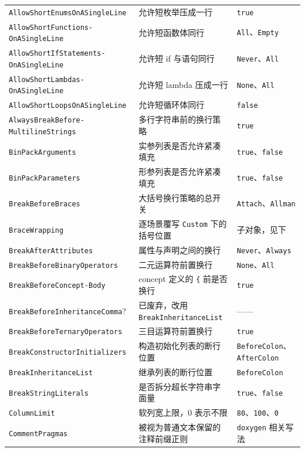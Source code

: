 \documentclass[12pt,a4paper,fontset=fandol]{ctexbook}
\begin{document}
{\begin{longtable}{@{}>{\raggedright\arraybackslash}p{}
                  >{\raggedright\arraybackslash}p{}
                  >{\raggedright\arraybackslash}p{}@{}}
\texttt{AllowShortEnums\allowbreak OnASingleLine} & 允许短枚举压成一行 & \texttt{true} \\
\texttt{AllowShortFunctions-\allowbreak OnASingleLine} & 允许短函数体同行 & \texttt{All}、\texttt{Empty} \\
\texttt{AllowShortIfStatements-\allowbreak OnASingleLine} & 允许短 if 与语句同行 & \texttt{Never}、\texttt{All} \\
\texttt{AllowShortLambdas-\allowbreak OnASingleLine} & 允许短 lambda 压成一行 & \texttt{None}、\texttt{All} \\
\texttt{AllowShortLoops\allowbreak OnASingleLine} & 允许短循环体同行 & \texttt{false} \\
\texttt{AlwaysBreakBefore-\allowbreak MultilineStrings} & 多行字符串前的换行策略 & \texttt{true} \\
\texttt{BinPackArguments} & 实参列表是否允许紧凑填充 & \texttt{true}、\texttt{false} \\
\texttt{BinPackParameters} & 形参列表是否允许紧凑填充 & \texttt{true}、\texttt{false} \\
\texttt{BreakBeforeBraces} & 大括号换行策略的总开关 & \texttt{Attach}、\texttt{Allman} \\
\texttt{BraceWrapping} & 逐场景覆写 \texttt{Custom} 下的括号位置 & 子对象，见下 \\
\texttt{BreakAfterAttributes} & 属性与声明之间的换行 & \texttt{Never}、\texttt{Always} \\
\texttt{BreakBefore\allowbreak BinaryOperators} & 二元运算符前置换行 & \texttt{None}、\texttt{All} \\
\texttt{BreakBeforeConcept-\allowbreak Body} & concept 定义的 \texttt{\{} 前是否换行 & \texttt{true} \\
\texttt{BreakBefore\allowbreak InheritanceComma}? & 已废弃，改用 \texttt{BreakInheritanceList} & —— \\
\texttt{BreakBefore\allowbreak TernaryOperators} & 三目运算符前置换行 & \texttt{true} \\
\texttt{BreakConstructor\allowbreak Initializers} & 构造初始化列表的断行位置 & \texttt{BeforeColon}、\texttt{AfterColon} \\
\texttt{BreakInheritanceList} & 继承列表的断行位置 & \texttt{BeforeColon} \\
\texttt{BreakStringLiterals} & 是否拆分超长字符串字面量 & \texttt{true}、\texttt{false} \\
\texttt{ColumnLimit} & 软列宽上限，0 表示不限 & \texttt{80}、\texttt{100}、\texttt{0} \\
\texttt{CommentPragmas} & 被视为普通文本保留的注释前缀正则 & \texttt{doxygen} 相关写法 \\

\end{longtable}}
\end{document}
